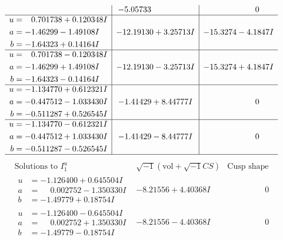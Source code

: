 \documentclass[1p]{elsarticle_modified}
\theoremstyle{definition}
\newcommand{\I}{\sqrt{-1}}
\begin{document}
$$\begin{array}{c|c|c}
 & -5.05733\phantom{ +0.000000I} & \phantom{-0.000000 } 0 \\ \hline\begin{aligned}
u &= \phantom{-}0.701738 + 0.120348 I \\
a &= -1.46299 - 1.49108 I \\
b &= -1.64323 + 0.14164 I\end{aligned}
 & -12.19130 + 3.25713 I & -15.3274 - 4.1847 I \\ \hline\begin{aligned}
u &= \phantom{-}0.701738 - 0.120348 I \\
a &= -1.46299 + 1.49108 I \\
b &= -1.64323 - 0.14164 I\end{aligned}
 & -12.19130 - 3.25713 I & -15.3274 + 4.1847 I \\ \hline\begin{aligned}
u &= -1.134770 + 0.612321 I \\
a &= -0.447512 - 1.033430 I \\
b &= -0.511287 + 0.526545 I\end{aligned}
 & -1.41429 + 8.44777 I & \phantom{-0.000000 } 0 \\ \hline\begin{aligned}
u &= -1.134770 - 0.612321 I \\
a &= -0.447512 + 1.033430 I \\
b &= -0.511287 - 0.526545 I\end{aligned}
 & -1.41429 - 8.44777 I & \phantom{-0.000000 } 0\\
 \hline 
 \end{array}$$\newpage$$\begin{array}{c|c|c}  
\text{Solutions to }I^u_{1}& \I (\text{vol} + \sqrt{-1}CS) & \text{Cusp shape}\\
 \hline 
\begin{aligned}
u &= -1.126400 + 0.645504 I \\
a &= \phantom{-}0.002752 - 1.350330 I \\
b &= -1.49779 + 0.18754 I\end{aligned}
 & -8.21556 + 4.40368 I & \phantom{-0.000000 } 0 \\ \hline\begin{aligned}
u &= -1.126400 - 0.645504 I \\
a &= \phantom{-}0.002752 + 1.350330 I \\
b &= -1.49779 - 0.18754 I\end{aligned}
 & -8.21556 - 4.40368 I & \phantom{-0.000000 } 0 \\ \hline\begin{aligned}

\end{aligned}
\end{array}$$
\end{document}
